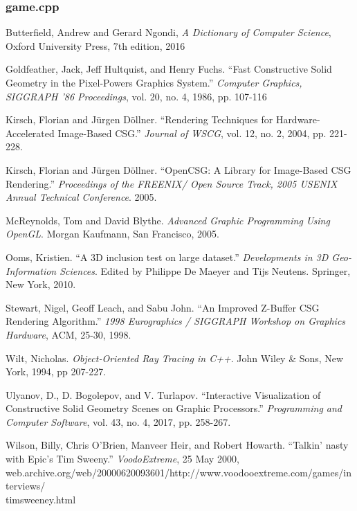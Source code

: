 \documentclass[12pt]{article}
\begin{document}
\begin{onehalfspace}
\subsubsection{game.cpp}


\newpage
\begin{thebibliography}{10}
  Butterfield, Andrew and Gerard Ngondi,
  \textit{A Dictionary of Computer Science},
  Oxford University Press,
  7th edition,
  2016

  Goldfeather, Jack, Jeff Hultquist, and Henry Fuchs. ``Fast Constructive Solid Geometry in the Pixel-Powers Graphics System.'' {\it Computer Graphics, SIGGRAPH '86 Proceedings}, vol. 20, no. 4, 1986,
pp. 107-116
  
  Kirsch, Florian and J\"{u}rgen D\"{o}llner. ``Rendering Techniques for Hardware-Accelerated Image-Based CSG.'' {\it Journal of WSCG}, vol. 12, no. 2, 2004, pp. 221-228.

  Kirsch, Florian and J\"{u}rgen D\"{o}llner. ``OpenCSG: A Library for Image-Based CSG Rendering.'' {\it Proceedings of the FREENIX/ Open Source Track, 2005 USENIX Annual Technical Conference}. 2005.

  McReynolds, Tom and David Blythe. {\it Advanced Graphic Programming Using OpenGL}. Morgan Kaufmann, San Francisco, 2005.

  Ooms, Kristien. ``A 3D inclusion test on large dataset.'' {\it Developments in 3D Geo-Information Sciences}. Edited by Philippe De Maeyer and Tijs Neutens. Springer, New York, 2010.

  Stewart, Nigel, Geoff Leach, and Sabu John. ``An Improved Z-Buffer CSG Rendering Algorithm.'' {\it 1998 Eurographics / SIGGRAPH Workshop on Graphics Hardware}, ACM, 25-30, 1998.

  Wilt, Nicholas. {\it Object-Oriented Ray Tracing in C++}. John Wiley \& Sons, New York, 1994, pp 207-227.

  Ulyanov, D., D. Bogolepov, and V. Turlapov. ``Interactive Visualization of Constructive Solid Geometry Scenes on Graphic Processors.'' {\it Programming and Computer Software}, vol. 43, no. 4, 2017, pp. 258-267.

  Wilson, Billy, Chris O'Brien, Manveer Heir, and Robert Howarth. ``Talkin' nasty with Epic's Tim Sweeny.'' {\it VoodoExtreme}, 25 May 2000, web.archive.org/web/20000620093601/http://www.voodooextreme.com/games/interviews/\\timsweeney.html
  
\end{thebibliography}
\end{onehalfspace}
\end{document}
